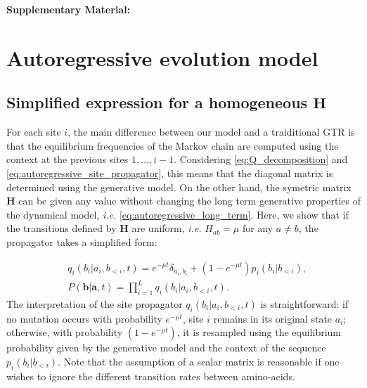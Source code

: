 
\begin{center}
\textbf{\large Supplementary Material: \papertitle}
\end{center}

\section{Autoregressive evolution model} %
\label{sec:autoregressive_evolution_model}

\subsection{Simplified expression for a homogeneous $\mathbf{H}$ }

For each site $i$, the main difference between our model and a traiditional GTR is that the equilibrium frequencies of the Markov chain are computed using the context at the previous sites $1,\ldots,i-1$. 
Considering \eqref{eq:Q_decomposition} and \eqref{eq:autoregressive_site_propagator}, this means that the diagonal matrix is determined using the generative model. 
On the other hand, the symetric matrix $\mathbf{H}$ can be given any value without changing the long term generative properties of the dynamical model, \emph{i.e.} \eqref{eq:autoregressive_long_term}. 
Here, we show that if the transitions defined by $\mathbf{H}$ are uniform, \emph{i.e.} $H_{ab} = \mu$ for any $a \neq b$, the propagator takes a simplified form: 

\begin{equation}
\begin{split}
	\label{eq:autoregressive_simplified_propagator}
	&q_i(b_i \vert a_i, b_{<i}, t) = e^{-\mu t} \delta_{a_i, b_i} + (1- e^{-\mu t})p_i(b_i \vert b_{<i}),\\
	&P(\mathbf{b} \vert \mathbf{a}, t) = \prod_{i=1}^L q_i(b_i \vert a_i, b_{<i}, t).
\end{split}
\end{equation}
The interpretation of the site propagator $q_i(b_i \vert a_i, b_{<i}, t)$ is straightforward: if no mutation occurs with probability $e^{-\mu t}$, site $i$ remains in its original state $a_i$; otherwise, with probability $(1- e^{-\mu t})$, it is resampled using the equilibrium probability given by the generative model and the context of the sequence $p_i(b_i \vert b_{<i})$. 
Note that the assumption of a scalar matrix is reasonable if one wishes to ignore the different transition rates between amino-acids. 


